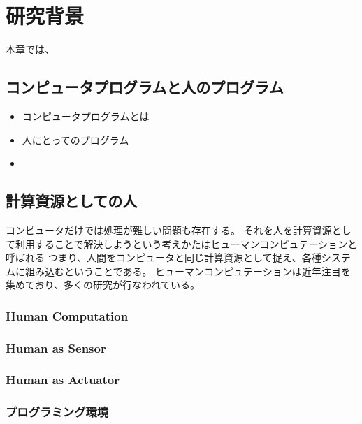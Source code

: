 \chapter{研究背景}
\label{chap:background}

本章では、

\section{コンピュータプログラムと人のプログラム}\label{ux30b3ux30f3ux30d4ux30e5ux30fcux30bfux30d7ux30edux30b0ux30e9ux30e0ux3068ux4ebaux306eux30d7ux30edux30b0ux30e9ux30e0}

\begin{itemize}
\item
  コンピュータプログラムとは
\item
  人にとってのプログラム
\item
\end{itemize}

\section{計算資源としての人}\label{ux8a08ux7b97ux8cc7ux6e90ux3068ux3057ux3066ux306eux4eba}

コンピュータだけでは処理が難しい問題も存在する。
それを人を計算資源として利用することで解決しようという考えかたはヒューマンコンピュテーション\cite{humancomputation}と呼ばれる
つまり、人間をコンピュータと同じ計算資源として捉え、各種システムに組み込むということである。
ヒューマンコンピュテーションは近年注目を集めており、多くの研究が行なわれている。

\subsection{Human Computation}\label{human-computation}

\subsection{Human as Sensor}\label{human-as-sensor}

\subsection{Human as Actuator}\label{human-as-actuator}

\subsection{プログラミング環境}\label{ux30d7ux30edux30b0ux30e9ux30dfux30f3ux30b0ux74b0ux5883}

